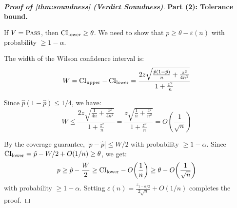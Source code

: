 \begin{proof}[\textbf{Proof of \cref{thm:soundness} (Verdict Soundness)}]
\textbf{Part (2): Tolerance bound.}

If $V = \textsc{Pass}$, then $\mathrm{CI}_{\text{lower}} \geq \theta$. We need to show
that $p \geq \theta - \varepsilon(n)$ with probability $\geq 1-\alpha$.

The width of the Wilson confidence interval is:
\begin{equation}
  W = \mathrm{CI}_{\text{upper}} - \mathrm{CI}_{\text{lower}} =
    \frac{2z\sqrt{\frac{\hat{p}(1-\hat{p})}{n} +
    \frac{z^2}{4n^2}}}{1 + \frac{z^2}{n}}
\end{equation}

Since $\hat{p}(1-\hat{p}) \leq 1/4$, we have:
\begin{equation}
  W \leq \frac{2z\sqrt{\frac{1}{4n} + \frac{z^2}{4n^2}}}
    {1 + \frac{z^2}{n}}
  = \frac{z\sqrt{\frac{1}{n} + \frac{z^2}{n^2}}}
    {1 + \frac{z^2}{n}}
  = O\!\left(\frac{1}{\sqrt{n}}\right)
\end{equation}

By the coverage guarantee, $|p - \hat{p}| \leq W/2$ with probability
$\geq 1-\alpha$. Since $\mathrm{CI}_{\text{lower}} = \hat{p} - W/2 + O(1/n)
\geq \theta$, we get:
\begin{equation}
  p \geq \hat{p} - \frac{W}{2}
  \geq \mathrm{CI}_{\text{lower}} - O\!\left(\frac{1}{n}\right)
  \geq \theta - O\!\left(\frac{1}{\sqrt{n}}\right)
\end{equation}
with probability $\geq 1-\alpha$. Setting
$\varepsilon(n) = \frac{z_{1-\alpha/2}}{2\sqrt{n}} + O(1/n)$ completes
the proof. \qedhere
\end{proof}


